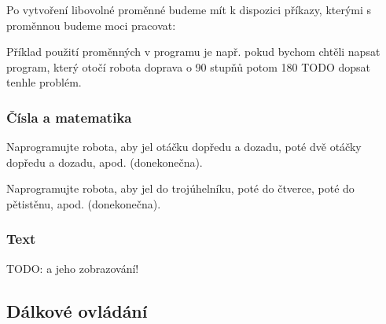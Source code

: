 \documentclass[../main.tex]{subfiles}
\begin{document}
	Po vytvoření libovolné proměnné budeme mít k dispozici příkazy, kterými s proměnnou budeme moci pracovat:
	\begin{itemize}
		\blockVariableChange
		\blockVariableGet
		\blockVariableSet
	\end{itemize}

	Příklad použití proměnných v programu je např. pokud bychom chtěli napsat program, který otočí robota doprava o 90 stupňů potom 180 TODO dopsat tenhle problém.

	\subsubsection{Čísla a matematika}

	\begin{question}
		Naprogramujte robota, aby jel otáčku dopředu a dozadu, poté dvě otáčky dopředu a dozadu, apod. (donekonečna).
	\end{question}

	\begin{question*}
		Naprogramujte robota, aby jel do trojúhelníku, poté do čtverce, poté do pětistěnu, apod. (donekonečna).
	\end{question*}

	\subsubsection{Text}
	TODO: a jeho zobrazování!

	\subsection{Dálkové ovládání}
\end{document}
